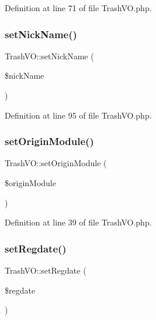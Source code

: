 Definition at line 71 of file Trash\+V\+O.\+php.

\mbox{\label{classTrashVO_a27720ec735924373fea7f6aeea738892}} 
\subsubsection{\texorpdfstring{set\+Nick\+Name()}{setNickName()}}
{\footnotesize\ttfamily Trash\+V\+O\+::set\+Nick\+Name (\begin{DoxyParamCaption}\item[{}]{\$nick\+Name }\end{DoxyParamCaption})}



Definition at line 95 of file Trash\+V\+O.\+php.

\mbox{\label{classTrashVO_a68e858c6a00999d0d3166af8c0df0d23}} 
\subsubsection{\texorpdfstring{set\+Origin\+Module()}{setOriginModule()}}
{\footnotesize\ttfamily Trash\+V\+O\+::set\+Origin\+Module (\begin{DoxyParamCaption}\item[{}]{\$origin\+Module }\end{DoxyParamCaption})}



Definition at line 39 of file Trash\+V\+O.\+php.

\mbox{\label{classTrashVO_ac23c4bcbc9167b243f7f292190e35cb8}} 
\subsubsection{\texorpdfstring{set\+Regdate()}{setRegdate()}}
{\footnotesize\ttfamily Trash\+V\+O\+::set\+Regdate (\begin{DoxyParamCaption}\item[{}]{\$regdate }\end{DoxyParamCaption})}



